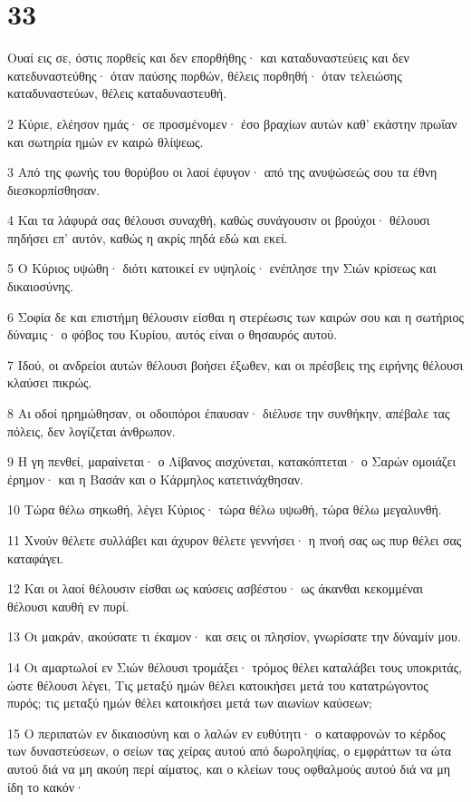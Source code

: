 \chapter{33}

\par Ουαί εις σε, όστις πορθείς και δεν επορθήθης· και καταδυναστεύεις και δεν κατεδυναστεύθης· όταν παύσης πορθών, θέλεις πορθηθή· όταν τελειώσης καταδυναστεύων, θέλεις καταδυναστευθή.
\par 2 Κύριε, ελέησον ημάς· σε προσμένομεν· έσο βραχίων αυτών καθ' εκάστην πρωΐαν και σωτηρία ημών εν καιρώ θλίψεως.
\par 3 Από της φωνής του θορύβου οι λαοί έφυγον· από της ανυψώσεώς σου τα έθνη διεσκορπίσθησαν.
\par 4 Και τα λάφυρά σας θέλουσι συναχθή, καθώς συνάγουσιν οι βρούχοι· θέλουσι πηδήσει επ' αυτόν, καθώς η ακρίς πηδά εδώ και εκεί.
\par 5 Ο Κύριος υψώθη· διότι κατοικεί εν υψηλοίς· ενέπλησε την Σιών κρίσεως και δικαιοσύνης.
\par 6 Σοφία δε και επιστήμη θέλουσιν είσθαι η στερέωσις των καιρών σου και η σωτήριος δύναμις· ο φόβος του Κυρίου, αυτός είναι ο θησαυρός αυτού.
\par 7 Ιδού, οι ανδρείοι αυτών θέλουσι βοήσει έξωθεν, και οι πρέσβεις της ειρήνης θέλουσι κλαύσει πικρώς.
\par 8 Αι οδοί ηρημώθησαν, οι οδοιπόροι έπαυσαν· διέλυσε την συνθήκην, απέβαλε τας πόλεις, δεν λογίζεται άνθρωπον.
\par 9 Η γη πενθεί, μαραίνεται· ο Λίβανος αισχύνεται, κατακόπτεται· ο Σαρών ομοιάζει έρημον· και η Βασάν και ο Κάρμηλος κατετινάχθησαν.
\par 10 Τώρα θέλω σηκωθή, λέγει Κύριος· τώρα θέλω υψωθή, τώρα θέλω μεγαλυνθή.
\par 11 Χνούν θέλετε συλλάβει και άχυρον θέλετε γεννήσει· η πνοή σας ως πυρ θέλει σας καταφάγει.
\par 12 Και οι λαοί θέλουσιν είσθαι ως καύσεις ασβέστου· ως άκανθαι κεκομμέναι θέλουσι καυθή εν πυρί.
\par 13 Οι μακράν, ακούσατε τι έκαμον· και σεις οι πλησίον, γνωρίσατε την δύναμίν μου.
\par 14 Οι αμαρτωλοί εν Σιών θέλουσι τρομάξει· τρόμος θέλει καταλάβει τους υποκριτάς, ώστε θέλουσι λέγει, Τις μεταξύ ημών θέλει κατοικήσει μετά του κατατρώγοντος πυρός; τις μεταξύ ημών θέλει κατοικήσει μετά των αιωνίων καύσεων;
\par 15 Ο περιπατών εν δικαιοσύνη και ο λαλών εν ευθύτητι· ο καταφρονών το κέρδος των δυναστεύσεων, ο σείων τας χείρας αυτού από δωροληψίας, ο εμφράττων τα ώτα αυτού διά να μη ακούη περί αίματος, και ο κλείων τους οφθαλμούς αυτού διά να μη ίδη το κακόν·

